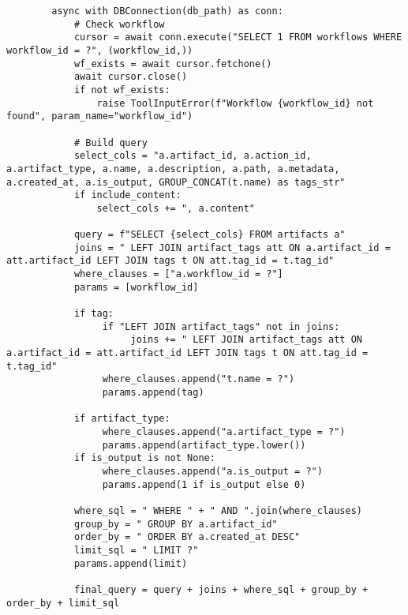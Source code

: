 \documentclass[12pt,a4paper]{article}
\begin{document}
\begin{pageablecode}
\begin{verbatim}
        async with DBConnection(db_path) as conn:
            # Check workflow
            cursor = await conn.execute("SELECT 1 FROM workflows WHERE workflow_id = ?", (workflow_id,))
            wf_exists = await cursor.fetchone()
            await cursor.close()
            if not wf_exists: 
                raise ToolInputError(f"Workflow {workflow_id} not found", param_name="workflow_id")

            # Build query
            select_cols = "a.artifact_id, a.action_id, a.artifact_type, a.name, a.description, a.path, a.metadata, a.created_at, a.is_output, GROUP_CONCAT(t.name) as tags_str"
            if include_content: 
                select_cols += ", a.content"

            query = f"SELECT {select_cols} FROM artifacts a"
            joins = " LEFT JOIN artifact_tags att ON a.artifact_id = att.artifact_id LEFT JOIN tags t ON att.tag_id = t.tag_id"
            where_clauses = ["a.workflow_id = ?"]
            params = [workflow_id]

            if tag:
                 if "LEFT JOIN artifact_tags" not in joins:
                      joins += " LEFT JOIN artifact_tags att ON a.artifact_id = att.artifact_id LEFT JOIN tags t ON att.tag_id = t.tag_id"
                 where_clauses.append("t.name = ?")
                 params.append(tag)

            if artifact_type:
                 where_clauses.append("a.artifact_type = ?")
                 params.append(artifact_type.lower())
            if is_output is not None:
                 where_clauses.append("a.is_output = ?")
                 params.append(1 if is_output else 0)

            where_sql = " WHERE " + " AND ".join(where_clauses)
            group_by = " GROUP BY a.artifact_id"
            order_by = " ORDER BY a.created_at DESC"
            limit_sql = " LIMIT ?"
            params.append(limit)

            final_query = query + joins + where_sql + group_by + order_by + limit_sql


\end{verbatim}
\end{pageablecode}
\end{document}
